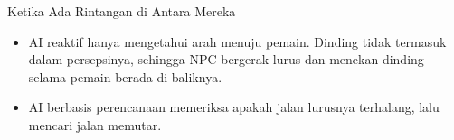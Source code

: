 \documentclass[aspectratio=169,10pt]{beamer}
\begin{document}
\begin{frame}{Ketika Ada Rintangan di Antara Mereka}
\begin{center}
\end{center}
\vspace{-0.02cm}
\begin{itemize}
  \item AI reaktif hanya mengetahui arah menuju pemain. Dinding tidak termasuk
        dalam persepsinya, sehingga NPC bergerak lurus dan menekan dinding
        selama pemain berada di baliknya.
  \item AI berbasis perencanaan memeriksa apakah jalan lurusnya terhalang,
        lalu mencari jalan memutar.
\end{itemize}
\end{frame}
\end{document}

